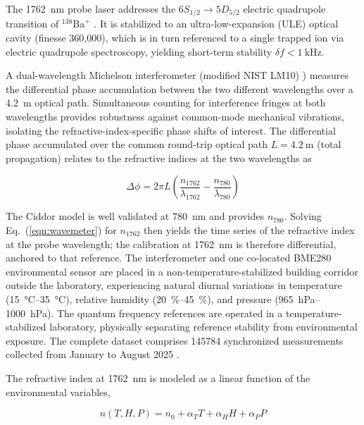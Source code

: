 \documentclass[aps,prapplied,reprint,groupedaddress,twocolumn,superscriptaddress,linenumbers]{revtex4-2}
\begin{document}
The \SI{1762}{\nano\meter} probe laser addresses the $6S_{1/2} \rightarrow 5D_{5/2}$ electric quadrupole transition of $^{138}\mathrm{Ba}^+$ \cite{arnold2020precision}. It is stabilized to an ultra-low-expansion (ULE) optical cavity (finesse 360,000), which is in turn referenced to a single trapped ion via electric quadrupole spectroscopy, yielding short-term stability $\delta f < \SI{1}{\kilo\hertz}$.

A dual-wavelength Michelson interferometer (modified NIST LM10) \cite{fox1999reliable}) measures the differential phase accumulation between the two different wavelengths over a \SI{4.2}{\meter} optical path. Simultaneous counting for interference fringes at both wavelengths provides robustness against common-mode mechanical vibrations, isolating the refractive-index-specific phase shifts of interest. The differential phase accumulated over the common round-trip optical path $L = \SI{4.2}{\meter}$ (total propagation) relates to the refractive indices at the two wavelengths as

\begin{equation}
\label{eqn:wavemeter}
\Delta\phi = 2\pi L\left(\frac{n_{1762}}{\lambda_{1762}} - \frac{n_{780}}{\lambda_{780}}\right)
\end{equation}

The Ciddor model is well validated at \SI{780}{\nano\meter} \cite{ciddor1996refractive} and provides $n_{780}$. Solving Eq.~(\ref{eqn:wavemeter}) for $n_{1762}$ then yields the time series of the refractive index at the probe wavelength; the calibration at \SI{1762}{\nano\meter} is therefore differential, anchored to that reference. The interferometer and one co-located BME280 environmental sensor \cite{bme280} are placed in a non-temperature-stabilized building corridor outside the laboratory, experiencing natural diurnal variations in temperature (\SIrange{15}{35}{\degreeCelsius}), relative humidity (\SIrange{20}{45}{\percent}), and pressure (\SIrange{965}{1000}{\hecto\pascal}). The quantum frequency references are operated in a temperature-stabilized laboratory, physically separating reference stability from environmental exposure. The complete dataset comprises \num{145784} synchronized measurements collected from January to August 2025 \cite{wu_2026_18800166}.

The refractive index at \SI{1762}{\nano\meter} is modeled as a linear function of the environmental variables,

\begin{equation}
n(T,H,P) = n_0 + \alpha_T T + \alpha_H H + \alpha_P P
\end{equation}
\end{document}
